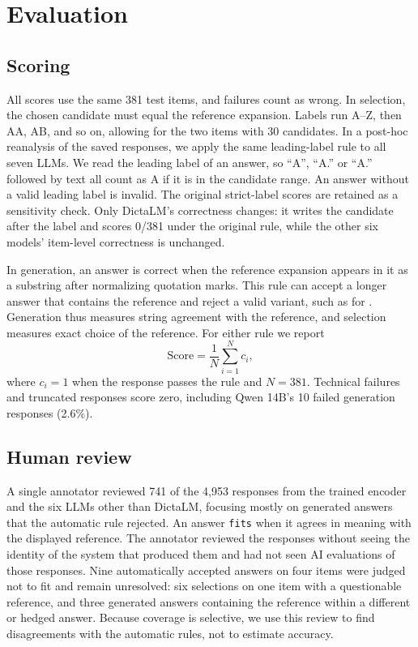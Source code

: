 \section{Evaluation}
\label{sec:eval}
\subsection{Scoring}
All scores use the same 381 test items, and failures count as wrong. In selection, the chosen candidate must equal the reference expansion. Labels run A--Z, then AA, AB, and so on, allowing for the two items with 30 candidates. In a post-hoc reanalysis of the saved responses, we apply the same leading-label rule to all seven LLMs. We read the leading label of an answer, so ``A'', ``A.'' or ``A.'' followed by text all count as A if it is in the candidate range. An answer without a valid leading label is invalid. The original strict-label scores are retained as a sensitivity check. Only DictaLM's correctness changes: it writes the candidate after the label and scores 0/381 under the original rule, while the other six models' item-level correctness is unchanged.

In generation, an answer is correct when the reference expansion appears in it as a substring after normalizing quotation marks. This rule can accept a longer answer that contains the reference and reject a valid variant, such as  for . Generation thus measures string agreement with the reference, and selection measures exact choice of the reference. For either rule we report
\begin{equation}
\mathrm{Score}=\frac{1}{N}\sum_{i=1}^{N}c_i,
\end{equation}
where $c_i=1$ when the response passes the rule and $N=381$. Technical failures and truncated responses score zero, including Qwen 14B's 10 failed generation responses (2.6\%).

\subsection{Human review}
A single annotator reviewed 741 of the 4,953 responses from the trained encoder and the six LLMs other than DictaLM, focusing mostly on generated answers that the automatic rule rejected. An answer \texttt{fits} when it agrees in meaning with the displayed reference. The annotator reviewed the responses without seeing the identity of the system that produced them and had not seen AI evaluations of those responses. Nine automatically accepted answers on four items were judged not to fit and remain unresolved: six selections on one item with a questionable reference, and three generated answers containing the reference within a different or hedged answer. Because coverage is selective, we use this review to find disagreements with the automatic rules, not to estimate accuracy.

